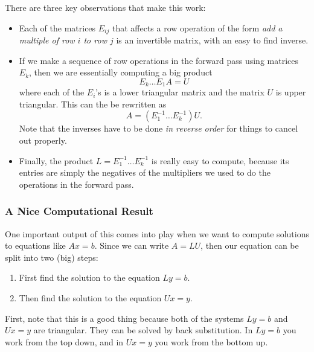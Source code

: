 \documentclass[10pt,]{book}
\theoremstyle{plain}
\theoremstyle{definition}
\numberwithin{equation}{section}
\begin{document}
      There are three key observations that make this work:
\begin{itemize}
\item{}
        Each of the matrices \(E_{ij}\) that affects a row operation of the
        form \emph{add a multiple of row \(i\) to row \(j\)} is an invertible
        matrix, with an easy to find inverse.
      \item{}
        If we make a sequence of row operations in the forward pass using
        matrices \(E_k\), then we are essentially computing a big product
        \[
        E_k \dots E_1 A = U
        \]
        where each of the \(E_i\)'s is a lower triangular matrix and the matrix
        \(U\) is upper triangular. This can the be rewritten as
        \[
        A = \left(E_1^{-1} \dots E_k^{-1} \right) U .
        \]
        Note that the inverses have to be done \emph{in reverse order} for things
        to cancel out properly.
      \item{}
        Finally, the product \(L = E_1^{-1} \dots E_k^{-1}\) is really easy to
        compute, because its entries are simply the negatives of the multipliers
        we used to do the operations in the forward pass.
      \end{itemize}
\typeout{************************************************}
\typeout{************************************************}
\subsubsection[A Nice Computational Result]{A Nice Computational Result}\label{subsubsection-24}

        One important output of this comes into play when we want to compute
        solutions to equations like \(Ax = b\). Since we can write \(A = LU\),
        then our equation can be split into two (big) steps:
        \begin{enumerate}
\item{} First find the solution to the equation \(Ly = b\).\item{} Then find the solution to the equation \(Ux = y\).\end{enumerate}

\par

        First, note that this is a good thing because both of the systems
        \(Ly = b\) and \(Ux = y\) are triangular. They can be solved by back
        substitution. In \(Ly = b\) you work from the top down, and in \(Ux=y\)
        you work from the bottom up.
\par
\end{document}
